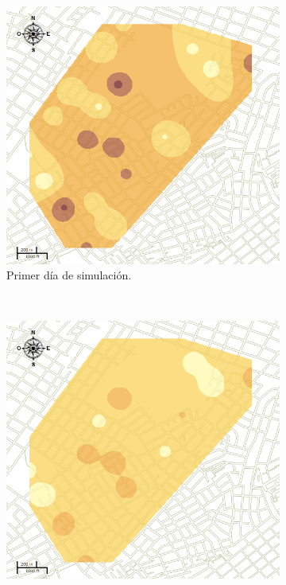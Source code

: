 \begin{figure}[!htbp]
    \centering
    \begin{subfigure}[b]{0.45\textwidth}
            \includegraphics[width=\textwidth]{capitulo-6/graphics/raster/temp-15-0.png}
            \caption{\label{fig:niveles-infestacion-15-a}Primer día de simulación.}
    \end{subfigure}
    ~~
    \begin{subfigure}[b]{0.45\textwidth}
            \includegraphics[width=\textwidth]{capitulo-6/graphics/raster/temp-15-2.png}

\end{subfigure}
\end{figure}
